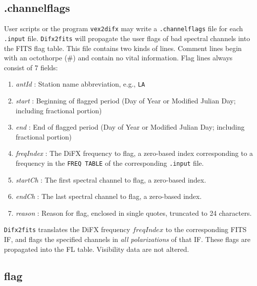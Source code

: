 
\subsection{.channelflags} \label{sec:dotchannelflags}

User scripts or the program {\tt vex2difx} may write a {\tt .channelflags} file for each {\tt .input} file.
{\tt Difx2fits} will propagate the user flags of bad spectral channels into the FITS flag table.
This file contains two kinds of lines.
Comment lines begin with an octothorpe (\#) and contain no vital information.
Flag lines always consist of 7 fields:
\begin{enumerate}
\item {\em antId} : Station name abbreviation, e.g., {\tt LA}
\item {\em start} : Beginning of flagged period (Day of Year or Modified Julian Day; including fractional portion)
\item {\em end} : End of flagged period (Day of Year or Modified Julian Day; including fractional portion)
\item {\em freqIndex} : The DiFX frequency to flag, a zero-based index corresponding to a frequency in the {\tt FREQ TABLE} of the corresponding {\tt .input} file.
\item {\em startCh} : The first spectral channel to flag, a zero-based index.
\item {\em endCh} : The last spectral channel to flag, a zero-based index.
\item {\em reason} : Reason for flag, enclosed in single quotes, truncated to 24 characters.
\end{enumerate}
{\tt Difx2fits} translates the DiFX frequency $freqIndex$ to the corresponding FITS IF, and flags the specified channels in {\em all polarizations} of that IF.
These flags are propagated into the FL table. Visibility data are not altered.



\subsection{flag} \label{sec:flag}

